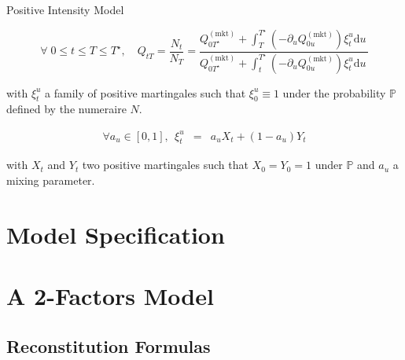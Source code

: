 \documentclass[serif]{beamer}
\newcommand\Qmkt{Q^{(\mathrm{mkt})}}
\numberwithin{equation}{section}
\newcommand\du{\mathrm{d}u\,}
\begin{document}
\begin{frame}{Positive Intensity Model}

\begin{Definition}[PIM] \em{

 \begin{equation}\label{eq::rbondformula}
\forall\; 0 \leq t \leq T \leq T^\star, \quad  Q_{tT} =\frac{N_t}{N_T}=\frac{\Qmkt_{0T^\star}+\int_T^{T^\star}{(- \partial_u \Qmkt_{0u}) \xi_t^u\du}}{\Qmkt_{0T^\star}+\int_t^{T^\star}{(-\partial_u \Qmkt_{0u}) \xi_t^u}\du}
\end{equation}

with $\xi_t^u$ a family of positive martingales such that $ \xi_0^u \equiv 1 $ under the probability $\mathbb{P}$ defined by the numeraire $N$.}
\end{Definition}

\begin{Definition} \em{

\begin{eqnarray}\label{eq::rbondformula}
\forall a_u \in [0,1], ~~\xi_t^u &=& a_uX_t + (1-a_u)Y_t
\end{eqnarray}

with $X_t$ and $Y_t$ two positive martingales such that $X_0 = Y_0 =1$ under $\mathbb{P}$ and $a_u$ a mixing parameter.}

\end{Definition}


 \end{frame}



\section{Model Specification}


\section{A  2-Factors Model}




\subsection{Reconstitution Formulas}
\end{document}
